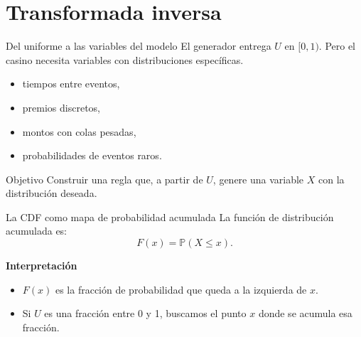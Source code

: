 \documentclass[aspectratio=1610, 9pt]{beamer}
\begin{document}
\section{Transformada inversa}

\begin{frame}{Del uniforme a las variables del modelo}
    El generador entrega $U$ en $[0,1)$.
    Pero el casino necesita variables con distribuciones específicas.

    \vspace{0.25cm}
    \begin{itemize}
        \item tiempos entre eventos,
        \item premios discretos,
        \item montos con colas pesadas,
        \item probabilidades de eventos raros.
    \end{itemize}

    \vspace{0.35cm}
    \begin{block}{Objetivo}
    Construir una regla que, a partir de $U$, genere una variable $X$ con la distribución deseada.
    \end{block}
\end{frame}

\begin{frame}{La CDF como mapa de probabilidad acumulada}
    La función de distribución acumulada es:
    \[
    F(x)=\mathbb{P}(X\le x).
    \]

    \vspace{0.25cm}
    \textbf{Interpretación}
    \begin{itemize}
        \item $F(x)$ es la fracción de probabilidad que queda a la izquierda de $x$.
        \item Si $U$ es una fracción entre 0 y 1, buscamos el punto $x$ donde se acumula esa fracción.
    \end{itemize}

    \vspace{0.2cm}
    \begin{center}
    \end{center}
\end{frame}
\end{document}
